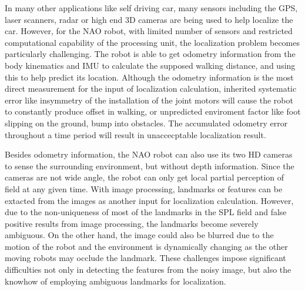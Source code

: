 
In many other applications like self driving car, many sensors including the GPS, laser scanners, radar or high end 3D cameras are being used to help localize the car. 
However, for the NAO robot, with limited number of sensors and restricted computational capability of the processing unit, the localization problem becomes particularly challenging. The robot is able to get odometry information from the body kinematics and \gls{IMU} to calculate the supposed walking distance, and using this to help predict its location. 
Although the odometry information is the most direct measurement for the input of localization calculation, inherited systematic error like insymmetry of the installation of the joint motors will cause the robot to constantly produce offset in walking, or unpredicted enviroment factor like foot slipping on the ground, bump into obstacles. 
The accumulated odometry error throughout a time period will result in unaccecptable localization result. 

Besides odometry information, the NAO robot can also use its two \gls{HD} cameras to sense the surrounding environment, but without depth information. Since the cameras are not wide angle, the robot can only get local partial perception of field at any given time.
With image processing, landmarks or features can be extacted from the images as another input for localization calculation. However, due to the non-uniqueness of most of the landmarks in the \gls{SPL} field and false positive results from image processing, the landmarks become severely ambiguous. On the other hand, the image could also be blurred due to the motion of the robot and the environment is dynamically changing as the other moving robots may occlude the landmark. These challenges impose significant difficulties not only in detecting the features from the noisy image, but also the knowhow of employing ambiguous landmarks for localization. 



